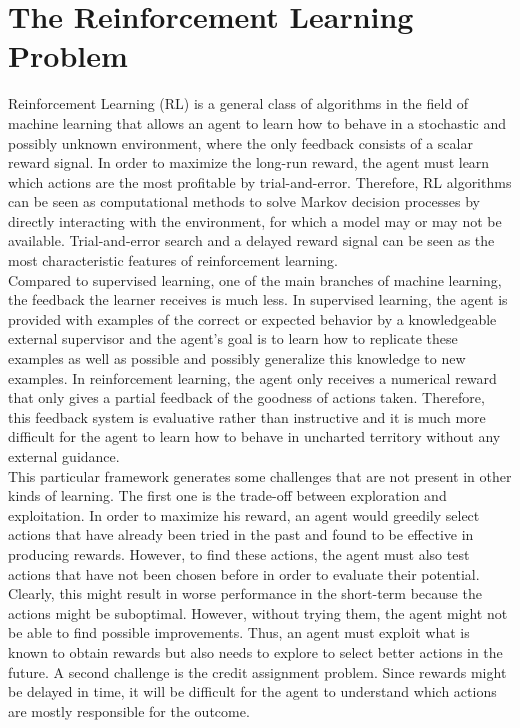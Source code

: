\section{The Reinforcement Learning Problem}
Reinforcement Learning (RL) is a general class of algorithms in the field of machine learning that allows an agent to learn how to behave in a stochastic and possibly unknown environment, where the only feedback consists of a scalar reward signal. In order to maximize the long-run reward, the agent must learn which actions are the most profitable by trial-and-error. Therefore, RL algorithms can be seen as computational methods to solve Markov decision processes by directly interacting with the environment, for which a model may or may not be available. Trial-and-error search and a delayed reward signal can be seen as the most characteristic features of reinforcement learning.\\
Compared to supervised learning, one of the main branches of machine learning, the feedback the learner receives is much less. In supervised learning, the agent is provided with examples of the correct or expected behavior by a knowledgeable external supervisor and the agent's goal is to learn how to replicate these examples as well as possible and possibly generalize this knowledge to new examples. In reinforcement learning, the agent only receives a numerical reward that only gives a partial feedback of the goodness of actions taken. Therefore, this feedback system is evaluative rather than instructive and it is much more difficult for the agent to learn how to behave in uncharted territory without any external guidance.\\ 
This particular framework generates some challenges that are not present in other kinds of learning. The first one is the trade-off between exploration and exploitation. In order to maximize his reward, an agent would greedily select actions that have already been tried in the past and found to be effective in producing rewards. However, to find these actions, the agent must also test actions that have not been chosen before in order to evaluate their potential. Clearly, this might result in worse performance in the short-term because the actions might be suboptimal. However, without trying them, the agent might not be able to find possible improvements. Thus, an agent must exploit what is known to obtain rewards but also needs to explore to select better actions in the future. A second challenge is the credit assignment problem. Since rewards might be delayed in time, it will be difficult for the agent to understand which actions are mostly responsible for the outcome. 


